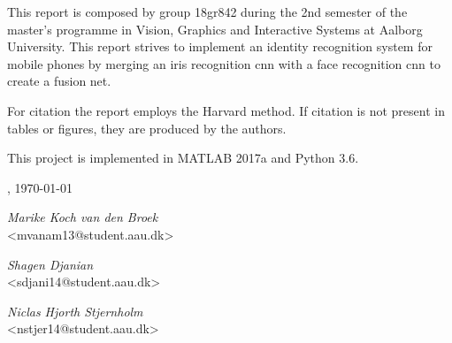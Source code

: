 This report is composed by group 18gr842 during the 2nd semester of the master's programme in Vision, Graphics and Interactive Systems at Aalborg University. This report strives to implement an identity recognition system for mobile phones by merging an iris recognition \gls{cnn} with a face recognition \gls{cnn} to create a fusion net. 

For citation the report employs the Harvard method. If citation is not present in tables or figures, they are produced by the authors. 

This project is implemented in MATLAB 2017a and Python 3.6. 

\vspace{\baselineskip}\hfill \AAU, \today
\vfill\noindent
\begin{center}
\begin{minipage}[b]{0.45\textwidth}
 \centering
  \textit{Marike Koch van den Broek}\\
  {\footnotesize <mvanam13@student.aau.dk>}
\end{minipage}
\begin{minipage}[b]{0.45\textwidth}
	\centering
	\textit{Shagen Djanian}\\
	{\footnotesize <sdjani14@student.aau.dk>}
\end{minipage}
\hspace{0.3cm}
\vspace{1\baselineskip}

\begin{minipage}[b]{0.45\textwidth}
	\centering
	\textit{Niclas Hjorth Stjernholm}\\
	{\footnotesize <nstjer14@student.aau.dk>}
\end{minipage}

\end{center}

